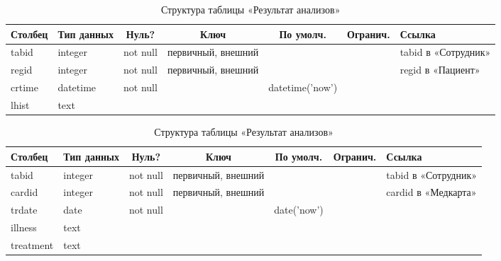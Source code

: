 \documentclass[14pt,a4paper,russian]{extreport}
\begin{document}
\begin{table}[h!]
    \caption{ } 
    \begin{subtable}[t]{\textwidth}
    \caption{Структура таблицы «Результат анализов»}
    \begin{tabularx}{\textwidth}{| X | X | c | c | c | c | X |}
        \hline
        \textbf{Столбец} & \textbf{Тип данных} & \textbf{Нуль?} & \textbf{Ключ} & \textbf{По
        умолч.} & \textbf{Огранич.} & \textbf{Ссылка} \\ \hline
        tabid & integer & not null & первичный, внешний & & & tabid в «Сотрудник» \\ \hline
        regid & integer & not null & первичный, внешний & & & regid в «Пациент» \\ \hline
        crtime & datetime & not null & & datetime('now') &  & \\ \hline
        lhist & text & & & & & \\ \hline
    \end{tabularx}
    \end{subtable}
    \label{table:patlink}
\end{table}

\begin{table}[h!]
    \caption{ } 
    \begin{subtable}[t]{\textwidth}
    \caption{Структура таблицы «Результат анализов»}
    \begin{tabularx}{\textwidth}{| X | X | c | c | c | c | X |}
        \hline
        \textbf{Столбец} & \textbf{Тип данных} & \textbf{Нуль?} & \textbf{Ключ} & \textbf{По
        умолч.} & \textbf{Огранич.} & \textbf{Ссылка} \\ \hline
        tabid & integer & not null & первичный, внешний & & & tabid в «Сотрудник» \\ \hline
        cardid & integer & not null & первичный, внешний & & & cardid в «Медкарта» \\ \hline
        trdate & date & not null & & date('now') & & \\ \hline 
        illness & text & & & & & \\ \hline
        treatment & text & & & & & \\ \hline
    \end{tabularx}
    \end{subtable}
    \label{table:treat}
\end{table}
\end{document}
